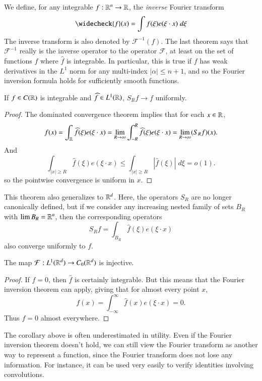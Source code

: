 We define, for any integrable $f: \operatorname{\mathbb{R}}^n \to \operatorname{\mathbb{R}}$, the \emph{inverse} Fourier transform
%
\[ \widecheck{f}(x) = \int f(\xi) e(\xi \cdot x)\; d\xi \]
%
The inverse transform is also denoted by $\mathcal{F}^{-1}(f)$. The last theorem says that $\mathcal{F}^{-1}$ really is the inverse operator to the operator $\mathcal{F}$, at least on the set of functions $f$ where $\widehat{f}$ is integrable. In particular, this is true if $f$ has weak derivatives in the $L^1$ norm for any multi-index $|\alpha| \leq n+1$, and so the Fourier inversion formula holds for sufficiently smooth functions.

\begin{corollary}
    If $f \in C(\operatorname{\mathbb{R}})$ is integrable and $\widehat{f} \in L^1(\operatorname{\mathbb{R}})$, $S_R f \to f$ uniformly.
\end{corollary}
\begin{proof}
    The dominated convergence theorem implies that for each $x \in\operatorname{\mathbb{R}}$,
    \[ f(x) = \int_{\operatorname{\mathbb{R}}} \widehat{f}(\xi) e(\xi \cdot x) = \lim_{R \to \infty} \int_{-R}^R \widehat{f}(\xi) e(\xi \cdot x) = \lim_{R \to \infty} (S_R f)(x). \]
    And
    \[ \int_{|x| \geq R} \widehat{f}(\xi) e(\xi \cdot x) \leq \int_{|x| \geq R} |\widehat{f}(\xi)|\; d\xi = o(1). \]
    so the pointwise convergence is uniform in $x$.
\end{proof}

\begin{remark}
    This theorem also generalizes to $\operatorname{\mathbb{R}}^d$. Here, the operators $S_R$ are no longer canonically defined, but if we consider any increasing nested family of sets $B_R$ with $\lim B_R = \operatorname{\mathbb{R}}^n$, then the corresponding operators
    \[ S_R f = \int_{B_R} \widehat{f}(\xi) e(\xi \cdot x) \]
    also converge uniformly to $f$.
\end{remark}

\begin{corollary}
    The map $\mathcal{F}: L^1(\operatorname{\mathbb{R}}^d) \to C_0(\operatorname{\mathbb{R}}^d)$ is injective.
\end{corollary}
\begin{proof}
    If $\widehat{f} = 0$, then $\widehat{f}$ is certainly integrable. But this means that the Fourier inversion theorem can apply, giving that for almost every point $x$,
    \[ f(x) = \int_{-\infty}^\infty \widehat{f}(x) e(\xi \cdot x) = 0. \]
    Thus $f = 0$ almost everywhere.
\end{proof}

The corollary above is often underestimated in utility. Even if the Fourier inversion theorem doesn't hold, we can still view the Fourier transform as another way to represent a function, since the Fourier transform does not lose any information. For instance, it can be used very easily to verify identities involving convolutions.

